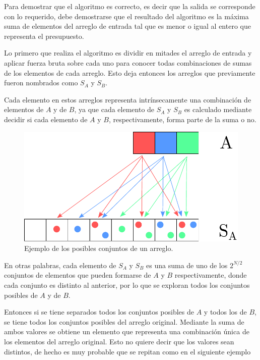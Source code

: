 Para demostrar que el algoritmo es correcto, es decir que la salida se
corresponde con lo requerido, debe demostrarse que el resultado del algoritmo es
la máxima suma de elementos del arreglo de entrada tal que es menor o igual al
entero que representa el presupuesto.

Lo primero que realiza el algoritmo es dividir en mitades el arreglo de entrada
y aplicar fuerza bruta sobre cada uno para conocer todas combinaciones de sumas
de los elementos de cada arreglo. Esto deja entonces los arreglos que
previamente fueron nombrados como $S_A$ y $S_B$.

Cada elemento en estos arreglos representa intrínsecamente una combinación de
elementos de $A$ y de $B$, ya que cada elemento de $S_A$ y $S_B$ es calculado
mediante decidir si cada elemento de $A$ y $B$, respectivamente, forma parte de
la suma o no.

\begin{figure}[H]
	\centering
	\includegraphics[scale=0.6]{imagenes/ex1_example1.pdf}
	\caption{Ejemplo de los posibles conjuntos de un arreglo.}
	\label{ej1:fig:combinations}
\end{figure}

En otras palabras, cada elemento de $S_A$ y $S_B$ es una suma de uno de los
$2^{N / 2}$ conjuntos de elementos que pueden formarse de $A$ y $B$
respectivamente, donde cada conjunto es distinto al anterior, por lo que se
exploran todos los conjuntos posibles de $A$ y de $B$.

Entonces si se tiene separados todos los conjuntos posibles de $A$ y todos los
de $B$, se tiene todos los conjuntos posibles del arreglo original. Mediante la
suma de ambos valores se obtiene un elemento que representa una combinación
única de los elementos del arreglo original. Esto no quiere decir que los
valores sean distintos, de hecho es muy probable que se repitan como en el
siguiente ejemplo

